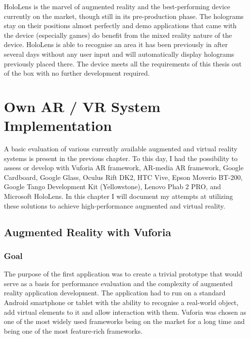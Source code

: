 \documentclass[12pt, a4paper]{article}
\begin{document}
HoloLens is the marvel of augmented reality and the best-performing device currently on the market, though still in its pre-production phase. The holograms stay on their positions almost perfectly and demo applications that came with the device (especially games) do benefit from the mixed reality nature of the device. HoloLens is able to recognise an area it has been previously in after several days without any user input and will automatically display holograms previously placed there. The device meets all the requirements of this thesis out of the box with no further development required.


\section{Own AR / VR System Implementation}
A basic evaluation of various currently available augmented and virtual reality systems is present in the previous chapter. To this day, I had the possibility to assess or develop with Vuforia AR framework, AR-media AR framework, Google Cardboard, Google Glass, Oculus Rift DK2, HTC Vive, Epson Moverio BT-200, Google Tango Development Kit (Yellowstone), Lenovo Phab 2 PRO, and Microsoft HoloLens. In this chapter I will document my attempts at utilizing these solutions to achieve high-performance augmented and virtual reality.

\subsection{Augmented Reality with Vuforia}
\subsubsection{Goal}
The purpose of the first application was to create a trivial prototype that would serve as a basis for performance evaluation and the complexity of augmented reality application development. The application had to run on a standard Android smartphone or tablet with the ability to recognise a real-world object, add virtual elements to it and allow interaction with them. Vuforia was chosen as one of the most widely used frameworks being on the market for a long time and being one of the most feature-rich frameworks.
\end{document}
